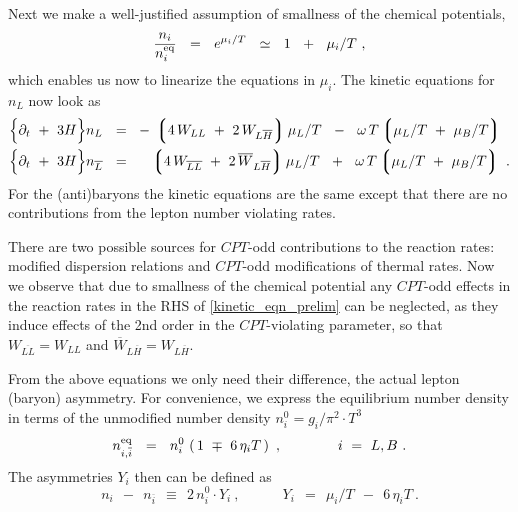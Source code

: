 \documentclass[12pt]{revtex4}
\newcommand{\eq}{{\rm eq}}
\newcommand{\lgr}{\left\lgroup}
\newcommand{\rgr}{\right\rgroup}
\newcommand{\p}{\partial}
\newcommand{\ov}{\overline}
\begin{document}
	Next we make a well-justified assumption of 
	smallness of the chemical potentials,
\[
	\frac{n_i}{n_i^\eq} ~~=~~ e^{\mu_i/T} ~~\simeq~~ 1 ~~+~~ \mu_i/T~,
\]
	which enables us now to linearize the equations in $ \mu_i $.	
	The kinetic equations for $ n_L $ now look as
\begin{equation}
\label{kinetic_eqn_prelim}
\begin{split}
	\Bigl\{ \p_t ~+~ 3H \Bigr\}
		n_L ~~=~~ & 
	-\, \lgr 4\, W_{LL} ~+~ 2\, W_{L\ov{H}} \rgr  \mu_L/T 
	~~-~~
	\omega\, T \lgr \mu_L/T ~+~ \mu_B/T \rgr 
	\\
	\Bigl\{ \p_t ~+~ 3H \Bigr\} 
		n_{\ov{L}} ~~=~~ &
	\phantom{-\,}
	\lgr 4\, W_{\ov{LL}} ~+~ 2\, \ov{W}_{L\ov{H}} \rgr  \mu_L/T 
	~~+~~
	\omega\, T \lgr \mu_L/T ~+~ \mu_B/T \rgr ~.
\end{split}
\end{equation}
	For the (anti)baryons the kinetic equations are the same except
	that there are no contributions from the lepton number violating
	rates. 

	There are two possible sources for $CPT$-odd contributions 
	to the reaction rates: modified dispersion relations and 
	$CPT$-odd modifications of thermal rates. Now we observe that due to smallness of the chemical potential
	any $CPT$-odd effects in the reaction rates in the RHS of 
	\eqref{kinetic_eqn_prelim} can be neglected, as
	they induce effects of the 2nd order in the $CPT$-violating parameter, so that
	$ W_{\ov{LL}} = W_{LL} $ and
	$ \ov{W}_{L\ov{H}} = W_{L\ov{H}} $.

	From the above equations we only need their difference, the actual
	lepton (baryon) asymmetry.
	For convenience, we express the equilibrium number density in terms
	of the unmodified number density 
	$ n_i^0 = g_i/\pi^2 \cdot T^3 $
\[
	n_{i,\ov{i}}^\eq ~~=~~ n_i^0\, \left(\, 1 ~\mp~ 6\,\eta_i T \,\right)~,
	\qquad\qquad{i ~=~ L, B}~.
\]
	The asymmetries $ Y_i $ then can be defined as
\[
	n_i ~~-~~ n_{\ov{i}} ~~\equiv~~ 2\, n_i^0 \cdot Y_i~,
	\qquad\quad Y_i ~~=~~ \mu_i/T ~~-~~ 6\,\eta_i T~.
\]
	
\end{document}
